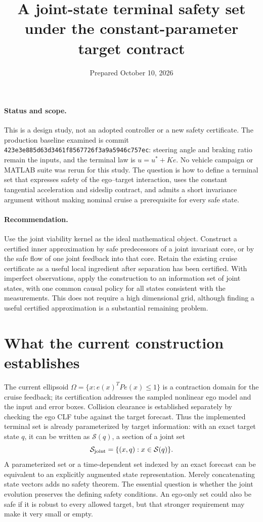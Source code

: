 \documentclass[11pt]{article}
\title{A joint-state terminal safety set under the constant-parameter target contract}
\author{}
\date{Prepared October 10, 2026}
\newcommand{\Sf}{\mathcal S}
\begin{document}
\maketitle

\paragraph{Status and scope.}
This is a design study, not an adopted controller or a new safety certificate.
The production baseline examined is commit
\texttt{423e3e885d63d3461f8567726f3a9a5946c757ec}: steering angle and braking
ratio remain the inputs, and the terminal law is $u=u^*+Ke$.
No vehicle campaign or MATLAB suite was rerun for this study.
The question is how to define a terminal set that expresses safety of the
ego--target interaction, uses the constant tangential acceleration and
sideslip contract, and admits a short invariance argument without making
nominal cruise a prerequisite for every safe state.

\paragraph{Recommendation.}
Use the joint viability kernel as the ideal mathematical object. Construct
a certified inner approximation by safe predecessors of a joint invariant
core, or by the safe flow of one joint feedback into that core. Retain the
existing cruise certificate as a useful local ingredient after separation
has been certified. With imperfect observations, apply the construction to
an information set of joint states, with one common causal policy for all
states consistent with the measurements. This does not require a high
dimensional grid, although finding a useful certified approximation is a
substantial remaining problem.

\section{What the current construction establishes}
The current ellipsoid $\Omega=\{x:e(x)^TPe(x)\leq1\}$ is a contraction
domain for the cruise feedback; its certification addresses the sampled
nonlinear ego model and the input and error boxes. Collision clearance is
established separately by checking the ego CLF tube against the target
forecast. Thus the implemented terminal set is already parameterized by
target information: with an exact target state $q$, it can be written as
$\Sf(q)$, a section of a joint set
\begin{equation}
\Sf_{\rm joint}=\{(x,q):x\in\Sf(q)\}.
\end{equation}
A parameterized set or a time-dependent set indexed by an exact forecast
can be equivalent to an explicitly augmented state representation. Merely
concatenating state vectors adds no safety theorem. The essential question
is whether the joint evolution preserves the defining safety conditions.
An ego-only set could also be safe if it is robust to every allowed target,
but that stronger requirement may make it very small or empty.
\end{document}

